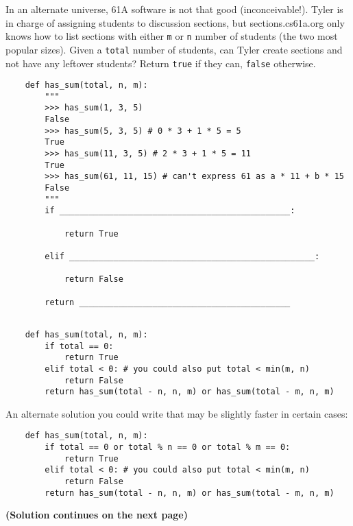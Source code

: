 \begin{blocksection}
    \question In an alternate universe, 61A software is not that good (inconceivable!). 
    Tyler is in charge of assigning students to discussion sections, but sections.cs61a.org 
    only knows how to list sections with either \lstinline$m$ or \lstinline$n$ number of students (the two most popular sizes). 
    Given a \lstinline$total$ number of students, can Tyler create sections and not have any leftover students? 
    Return \lstinline$true$ if they can, \lstinline$false$ otherwise.
    
    \begin{lstlisting}
    def has_sum(total, n, m):
        """
        >>> has_sum(1, 3, 5)
        False
        >>> has_sum(5, 3, 5) # 0 * 3 + 1 * 5 = 5
        True
        >>> has_sum(11, 3, 5) # 2 * 3 + 1 * 5 = 11
        True
        >>> has_sum(61, 11, 15) # can't express 61 as a * 11 + b * 15
        False
        """
        if _______________________________________________:
    
            return True
    
        elif __________________________________________________:
    
            return False
    
        return ___________________________________________
    
    \end{lstlisting}
    \end{blocksection}
    
    \begin{solution}[1.5in]
    \begin{blocksection}
    \begin{lstlisting}
    def has_sum(total, n, m):
        if total == 0:
            return True
        elif total < 0: # you could also put total < min(m, n)
            return False
        return has_sum(total - n, n, m) or has_sum(total - m, n, m)
    \end{lstlisting}
    An alternate solution you could write that may be slightly faster in certain cases:
    \begin{lstlisting}
    def has_sum(total, n, m):
        if total == 0 or total % n == 0 or total % m == 0:
            return True
        elif total < 0: # you could also put total < min(m, n)
            return False
        return has_sum(total - n, n, m) or has_sum(total - m, n, m)
    \end{lstlisting}
    
    \textbf{(Solution continues on the next page)}
    \end{blocksection}
    \end{solution}
    
